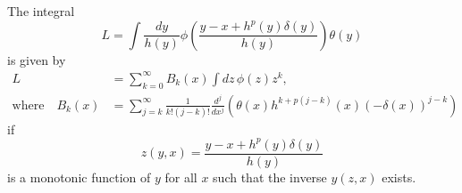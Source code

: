\begin{lem}
\label{lem:integral-smoothing}The integral 
\[
L=\int\frac{dy}{h\left(y\right)}\phi\left(\frac{y-x+h^{p}\left(y\right)\delta\left(y\right)}{h\left(y\right)}\right)\theta\left(y\right)
\]
is given by
\begin{align*}
L & =\sum_{k=0}^{\infty}B_{k}\left(x\right)\int dz\,\phi\left(z\right)z^{k},\\
\text{where}\quad B_{k}\left(x\right) & =\sum_{j=k}^{\infty}\frac{1}{k!\left(j-k\right)!}\frac{d^{j}}{dx^{j}}\left(\theta\left(x\right)h^{k+p\left(j-k\right)}\left(x\right)\left(-\delta\left(x\right)\right)^{j-k}\right)
\end{align*}
if 
\begin{equation}
z\left(y,x\right)=\frac{y-x+h^{p}\left(y\right)\delta\left(y\right)}{h\left(y\right)}\label{eq:smoothing-change-of-variables}
\end{equation}
is a monotonic function of $y$ for all $x$ such that the inverse $y\left(z,x\right)$ exists.\end{lem}
